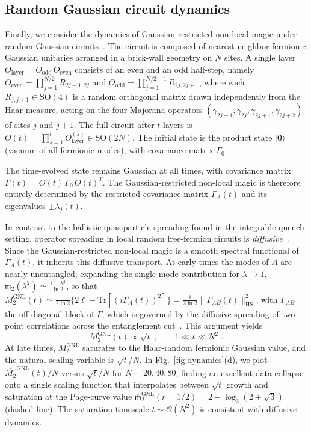 \documentclass[prx,twocolumn,superscriptaddress,aps,10pt, frontmatterverbose, reprint,footinbib,longbibliography=true]{revtex4-2}
\providecommand{\DIFaddtex}[1]{{\protect\color{red}#1}} %
\providecommand{\DIFaddbegin}{\protect\color{red}} %
\providecommand{\DIFaddend}{\protect\color{black}} %
\providecommand{\DIFaddtex}[1]{\texorpdfstring{\DIFaddtex{#1}}{#1}} %
\providecommand{\DIFadd}[1]{\texorpdfstring{\DIFaddtex{#1}}{#1}} %
\newcommand{\DIFaddincludegraphics}[2][]{{\color{blue}\fbox{\DIFOincludegraphics[#1]{#2}}}} %
\DeclareRobustCommand{\DIFaddbegin}{\DIFOaddbegin \let\includegraphics\DIFaddincludegraphics} %
\DeclareRobustCommand{\DIFaddend}{\DIFOaddend \let\includegraphics\DIFOincludegraphics} %
\begin{document}
\subsection{Random Gaussian circuit dynamics}
Finally, we consider the dynamics of Gaussian-restricted non-local magic under random Gaussian circuits~\cite{tirrito2025magicphasetransitionsmonitored}.
The circuit is composed of nearest-neighbor fermionic Gaussian unitaries arranged in a brick-wall geometry on $N$ sites.
A single layer $O_{\mathrm{layer}} = O_{\mathrm{odd}}\,O_{\mathrm{even}}$ consists of an even and an odd half-step, namely $O_{\mathrm{even}} = \prod_{j=1}^{N/2} R_{2j-1,2j}$ and $O_{\mathrm{odd}} = \prod_{j=1}^{N/2-1} R_{2j,2j+1}$, where each $R_{j,j+1} \in \mathrm{SO}(4)$ is a random orthogonal matrix drawn independently from the Haar measure, acting on the four Majorana operators $(\gamma_{2j-1}, \gamma_{2j}, \gamma_{2j+1}, \gamma_{2j+2})$ of sites $j$ and $j+1$.
The full circuit after $t$ layers is $O(t) = \prod_{s=1}^t O_{\mathrm{layer}}^{(s)} \in \mathrm{SO}(2N)$.
The initial state is the product state $|\mathbf{0}\rangle$ (vacuum of all fermionic modes), with covariance matrix $\Gamma_0$. 

The time-evolved state remains Gaussian at all times, with covariance matrix $\Gamma(t) = O(t)\,\Gamma_0\,O(t)^T$.
The Gaussian-restricted non-local magic is therefore entirely determined by the restricted covariance matrix $\Gamma_A(t)$ and its eigenvalues $\pm\lambda_j(t)$.

In contrast to the ballistic quasiparticle spreading found in the integrable quench setting, operator spreading in local random free-fermion circuits is \emph{diffusive}~\cite{dias2021diffusiveoperatorspreadingrandom,swann}.
Since the Gaussian-restricted non-local magic is a smooth spectral functional of $\Gamma_A(t)$, it inherits this diffusive transport.
At early times \DIFaddbegin \DIFadd{the modes of $A$ are nearly unentangled; }\DIFaddend expanding the single-mode contribution for \DIFaddbegin \DIFadd{$\lambda\to1$, $\mathfrak{m}_2(\lambda^2) \simeq \frac{1-\lambda^2}{\ln 2}$}\DIFaddend , so that \DIFaddbegin \DIFadd{$M_2^{\mathrm{GNL}}(t) \simeq \frac{1}{2\ln 2}\{2\ell-\mathrm{Tr}[(i\Gamma_A(t))^2]\}=\frac{1}{2\ln 2}\|\Gamma_{AB}(t)\|_{\mathrm{HS}}^2$, with $\Gamma_{AB}$ the off-diagonal block of $\Gamma$}\DIFaddend , which is governed by the diffusive spreading of two-point correlations across the entanglement cut~\cite{dias2021diffusiveoperatorspreadingrandom}.
This argument yields
\begin{equation}
    M_2^{\mathrm{GNL}}(t) \propto \sqrt{t}\;, \qquad 1 \ll t \ll N^2\;.
\end{equation}
At late times, $M_2^{\mathrm{GNL}}$ saturates to the Haar-random fermionic Gaussian value, and the natural scaling variable is $\sqrt{t}/N$.
In Fig.~\ref{fig:dynamics}(d), we plot $\overline{M_2}^{\mathrm{GNL}}(t)/N$ versus $\sqrt{t}/N$ for $N = 20, 40, 80$, finding an excellent data collapse onto a single scaling function that interpolates between $\sqrt{t}$ growth and saturation at the Page-curve value $\overline{\mathsf{m}}_{2}^{\mathrm{GNL}}(r=1/2)=2-\log_2(2+\sqrt{3})$  (dashed line).
The saturation timescale $t\sim\mathcal{O}(N^2)$ is consistent with diffusive dynamics.
\end{document}
